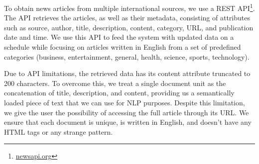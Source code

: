 \documentclass[a4paper]{article}
\begin{document}
\begin{table}[]
  \centering
  \caption{Competitive Intelligence resources on the web - \citet{dey2011}}
  \label{table1}
\end{table}

To obtain news articles from multiple international sources, we use a REST API\footnote{\href{https://newsapi.org/}{newsapi.org}}. The API retrieves the articles, as well as their metadata, consisting of attributes such as source, author, title, description, content, category, URL, and publication date and time. We use this API to feed the system with updated data on a schedule while focusing on articles written in English from a set of predefined categories (business, entertainment, general, health, science, sports, technology).

Due to API limitations, the retrieved data has its content attribute truncated to 200 characters. To overcome this, we treat a single document unit as the concatenation of title, description, and content, providing us a semantically loaded piece of text that we can use for NLP purposes. Despite this limitation, we give the user the possibility of accessing the full article through its URL. We ensure that each document is unique, is written in English, and doesn't have any HTML tags or any strange pattern.
\end{document}

